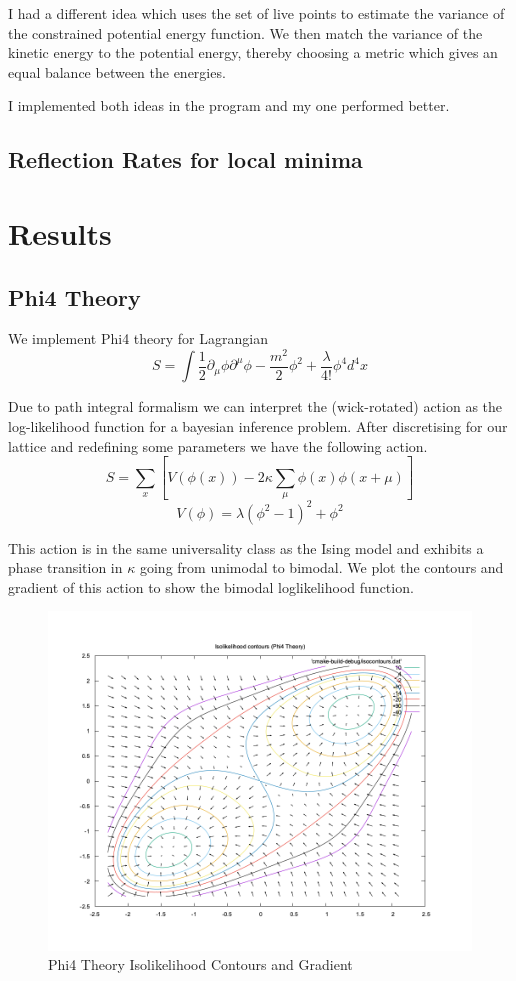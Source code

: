 \documentclass[11pt]{article}
\begin{document}
    I had a different idea which uses the set of live points to estimate the variance of the constrained
    potential energy function.
    We then match the variance of the kinetic energy to the potential energy, thereby
    choosing a metric which gives an equal balance between the energies.

    I implemented both ideas in the program and my one performed better.

    \subsection{Reflection Rates for local minima}

    \newpage
    \section{Results}
    \subsection{Phi4 Theory}
    We implement Phi4 theory for Lagrangian
    \[
        S = \int{\frac{1}{2} \partial_{\mu} \phi \partial^{\mu} \phi
    -\frac{m^2}{2} \phi^2  + \frac{\lambda}{4!} \phi^4 d^4x}
    \]

    Due to path integral formalism we can interpret the (wick-rotated) action as the log-likelihood function
    for a bayesian inference problem.
    After discretising for our lattice and redefining some parameters we have the following action.
    \[
        S = \sum_{x}\left[ V(\phi(x)) - 2\kappa \sum_{\mu}{\phi(x)\phi(x+\mu)} \right]
    \]
    \[
        V(\phi) = \lambda (\phi^2 - 1)^2 + \phi^2
    \]

    This action is in the same universality class as the Ising model and exhibits a phase transition
    in $\kappa$ going from unimodal to bimodal. We plot the contours and gradient of this action
    to show the bimodal loglikelihood function.

    \begin{figure}[H]
        \centering
        \includegraphics[width=0.75\linewidth]{../figures/phi4_isocontours}
        \caption{Phi4 Theory Isolikelihood Contours and Gradient}
        \label{fig:phi4contour}
    \end{figure}
\end{document}
